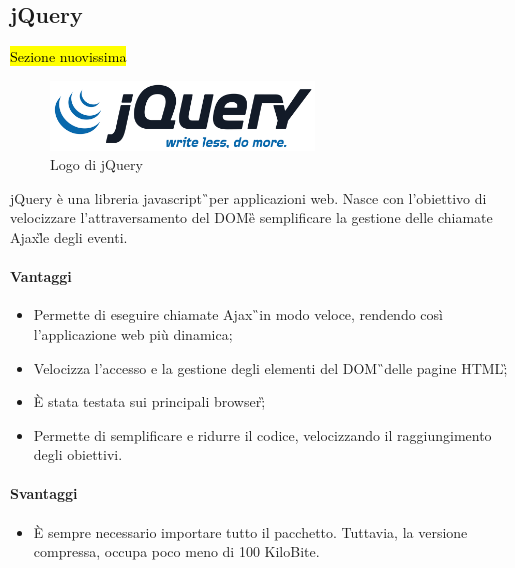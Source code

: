 \subsection{jQuery}
	\hl{Sezione nuovissima}
	\begin{figure}[H]
		\begin{center}
			\includegraphics[width=7cm]{Pics/jquery_logo.png}
			\caption{Logo di jQuery}
			\label{fig:jQueryLogo}
		\end{center}
	\end{figure}
	jQuery è una libreria \gls{javascript}\G\ per applicazioni web. Nasce con l'obiettivo di velocizzare l'attraversamento del \gls{DOM}\G  e semplificare la gestione delle chiamate \gls{Ajax}\G le degli eventi.
\paragraph{Vantaggi}
	\begin{itemize}
		\item Permette di eseguire chiamate \gls{Ajax}\G\ in modo veloce, rendendo così l'applicazione web più dinamica;
		\item Velocizza l'accesso e la gestione degli elementi del \gls{DOM}\G\ delle pagine \gls{HTML}\G;
		\item È stata testata sui principali \gls{browser}\G;
		\item Permette di semplificare e ridurre il codice, velocizzando il raggiungimento degli obiettivi. 
	\end{itemize}
\paragraph{Svantaggi}
	\begin{itemize}
		\item È sempre necessario importare tutto il pacchetto. Tuttavia, la versione compressa, occupa poco meno di 100 KiloBite. 
\end{itemize}